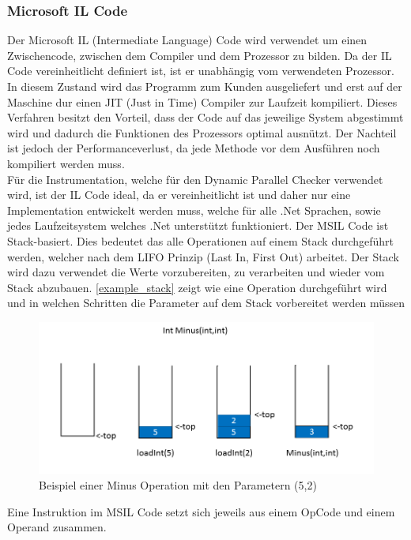 \documentclass[10pt,a4paper]{article}
\begin{document}
\subsubsection{Microsoft IL Code}\label{chapter_IL}
\begin{flushleft}
Der Microsoft IL (Intermediate Language) Code wird verwendet um einen Zwischencode, zwischen dem Compiler und dem Prozessor zu bilden. Da der IL Code vereinheitlicht definiert ist, ist er unabhängig vom verwendeten Prozessor. In diesem Zustand wird das Programm zum Kunden ausgeliefert und erst auf der Maschine dur einen JIT (Just in Time) Compiler zur Laufzeit kompiliert. Dieses Verfahren besitzt den Vorteil, dass der Code auf das jeweilige System abgestimmt wird und dadurch die Funktionen des Prozessors optimal ausnützt. Der Nachteil ist jedoch der Performanceverlust, da jede Methode vor dem Ausführen noch kompiliert werden muss.\\
Für die Instrumentation, welche für den Dynamic Parallel Checker verwendet wird, ist der IL Code ideal, da er vereinheitlicht ist und daher nur eine Implementation entwickelt werden muss, welche für alle .Net Sprachen, sowie jedes Laufzeitsystem welches .Net unterstützt funktioniert.\newpage
Der MSIL Code ist Stack-basiert. Dies bedeutet das alle Operationen auf einem Stack durchgeführt werden, welcher nach dem LIFO Prinzip (Last In, First Out) arbeitet. Der Stack wird dazu verwendet die Werte vorzubereiten, zu verarbeiten und wieder vom Stack abzubauen. \autoref{example_stack} zeigt wie eine Operation durchgeführt wird und in welchen Schritten die Parameter auf dem Stack vorbereitet werden müssen\\
\begin{figure}[H]
\centering
\includegraphics[scale=0.5]{images/BeispielStack.png}
\caption{Beispiel einer Minus Operation mit den Parametern (5,2)}
\label{example_stack}
\end{figure}
Eine Instruktion im MSIL Code setzt sich jeweils aus einem OpCode und einem Operand zusammen.

\end{flushleft}
\end{document}
